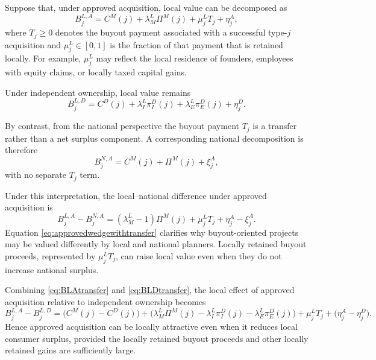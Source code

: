 Suppose that, under approved acquisition, local value can be decomposed as
\begin{equation}\label{eq:BLAtransfer}
    B_j^{L,A}
    =
    C^M(j)
    + \lambda_M^L \Pi^M(j)
    + \mu_j^L T_j
    + \eta_j^A,
\end{equation}
where \(T_j \ge 0\) denotes the buyout payment associated with a successful type-\(j\) acquisition and
\(\mu_j^L \in [0,1]\) is the fraction of that payment that is retained locally.
For example, \(\mu_j^L\) may reflect the local residence of founders, employees with equity claims, or locally taxed capital gains.

Under independent ownership, local value remains
\begin{equation}\label{eq:BLDtransfer}
    B_j^{L,D}
    =
    C^D(j)
    + \lambda_I^L \pi_I^D(j)
    + \lambda_E^L \pi_E^D(j)
    + \eta_j^D.
\end{equation}

By contrast, from the national perspective the buyout payment \(T_j\) is a transfer rather than a net surplus component.
A corresponding national decomposition is therefore
\begin{equation}\label{eq:BNAtransfer}
    B_j^{N,A}
    =
    C^M(j)
    + \Pi^M(j)
    + \xi_j^A,
\end{equation}
with no separate \(T_j\) term.

Under this interpretation, the local--national difference under approved acquisition is
\begin{equation}\label{eq:approvedwedgewithtransfer}
    B_j^{L,A} - B_j^{N,A}
    =
    (\lambda_M^L-1)\Pi^M(j)
    + \mu_j^L T_j
    + \eta_j^A - \xi_j^A.
\end{equation}
Equation \eqref{eq:approvedwedgewithtransfer} clarifies why buyout-oriented projects may be valued differently by local and national planners.
Locally retained buyout proceeds, represented by \(\mu_j^L T_j\), can raise local value even when they do not increase national surplus.

Combining \eqref{eq:BLAtransfer} and \eqref{eq:BLDtransfer}, the local effect of approved acquisition relative to independent ownership becomes
\begin{equation}\label{eq:localdifferencewithtransfer}
    B_j^{L,A}-B_j^{L,D}
    =
    \bigl(C^M(j)-C^D(j)\bigr)
    + \bigl(\lambda_M^L\Pi^M(j)-\lambda_I^L\pi_I^D(j)-\lambda_E^L\pi_E^D(j)\bigr)
    + \mu_j^L T_j
    + \bigl(\eta_j^A-\eta_j^D\bigr).
\end{equation}
Hence approved acquisition can be locally attractive even when it reduces local consumer surplus, provided the locally retained buyout proceeds and other locally retained gains are sufficiently large.

